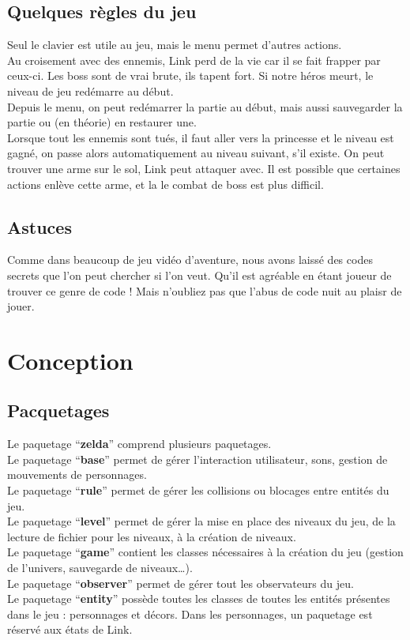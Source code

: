 \documentclass[a4paper,11pt]{article}
\begin{document}
\subsection{Quelques r\`egles du jeu}
Seul le clavier est utile au jeu, mais le menu permet d'autres actions.\\
Au croisement avec des ennemis, Link perd de la vie car il se fait
frapper par ceux-ci. Les boss sont de vrai brute, ils tapent fort. Si
notre h\'eros meurt, le niveau de
jeu red\'emarre au d\'ebut. \\
Depuis le menu, on peut red\'emarrer la partie au d\'ebut, mais aussi sauvegarder la
partie ou (en th\'eorie) en restaurer une.\\
Lorsque tout les ennemis sont tu\'es, il faut aller vers la princesse et le
niveau est gagn\'e, on passe alors automatiquement au niveau suivant, s'il existe.
On peut trouver une arme sur le sol, Link peut attaquer avec. Il est possible
que certaines actions enl\`eve cette arme, et la le combat de boss est
plus difficil. 

\subsection{Astuces}
Comme dans beaucoup de jeu vid\'eo d'aventure, nous avons laiss\'e des codes
secrets que l'on peut chercher si l'on veut. Qu'il est agr\'eable en \'etant joueur
de trouver ce genre de code ! Mais n'oubliez pas que l'abus de code nuit
au plaisr de jouer.

\newpage

\section{Conception}

\subsection{Pacquetages}
Le paquetage ``\textbf{zelda}'' comprend plusieurs paquetages.\\
Le paquetage ``\textbf{base}'' permet de g\'erer l'interaction utilisateur, sons,
gestion de mouvements de personnages.\\ 
Le paquetage ``\textbf{rule}'' permet de
g\'erer les collisions ou blocages entre entit\'es du jeu.\\ 
Le paquetage
``\textbf{level}'' permet de g\'erer la mise en place des niveaux du jeu, de la
lecture de fichier pour les niveaux, \`a la cr\'eation de niveaux.\\ 
Le paquetage
``\textbf{game}'' contient les classes n\'ecessaires \`a la cr\'eation du jeu
(gestion de l'univers, sauvegarde de niveaux\ldots).\\ 
Le paquetage
``\textbf{observer}'' permet de g\'erer tout les observateurs du jeu.\\ 
Le paquetage ``\textbf{entity}'' poss\`ede toutes les classes de toutes les entit\'es 
pr\'esentes dans le jeu : personnages et d\'ecors. Dans les personnages, un paquetage 
est r\'eserv\'e aux \'etats de Link.\\
\end{document}
